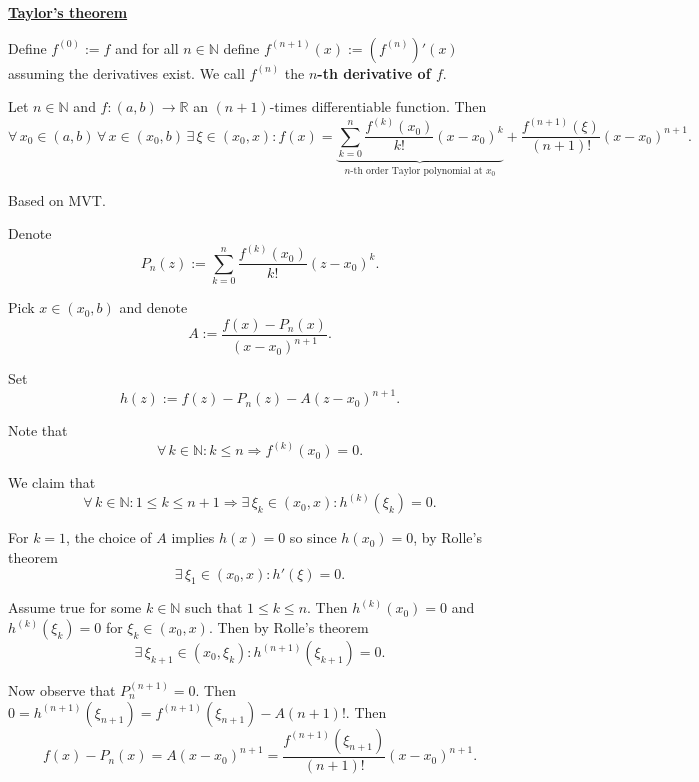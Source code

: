 \documentclass{notes}
\begin{document}
{\boldmath \bfseries \underline{Taylor's theorem}}

\begin{defn}
  Define $f^{(0)} := f$ and for all $n \in \mathbb N$ define $f^{(n + 1)}(x) := \left ( f^{(n)} \right )'(x)$ assuming the derivatives exist.
  We call $f^{(n)}$ the {\boldmath \bfseries $n$-th derivative of $f$}.
\end{defn}

\begin{thm}
  Let $n \in \mathbb N$ and $f \colon (a, b) \to \mathbb R$ an $(n + 1)$-times differentiable function.
  Then 
  \[
    \forall \, x_0 \in (a, b) \, \forall \, x \in (x_0, b) \, \exists \, \xi \in (x_0, x): f(x) = \underbrace{\sum_{k = 0}^n \frac{f^{(k)}(x_0)}{k!} (x - x_0)^k}_{\text{$n$-th order Taylor polynomial at $x_0$}} {} + \frac{f^{(n + 1)}(\xi)}{(n + 1)!} (x - x_0)^{n + 1}.
  \]
\end{thm}

\begin{prf}
  Based on MVT.
  
  Denote
  \[
    P_n(z) := \sum_{k = 0}^n \frac{f^{(k)}(x_0)}{k!} (z - x_0)^k.
  \]
  

  Pick $x \in (x_0, b)$ and denote 
  \[
    A := \frac{f(x) - P_n(x)}{(x - x_0)^{n + 1}}.
  \]
  
  Set 
  \[
    h(z) := f(z) - P_n(z) - A(z - x_0)^{n + 1}.
  \]
  
  Note that 
  \[
    \forall \, k \in \mathbb N: k \leq n \Rightarrow f^{(k)}(x_0) = 0.
  \]
  
  We claim that 
  \[
    \forall \, k \in \mathbb N: 1 \leq k \leq n + 1 \Rightarrow \exists \, \xi_k \in (x_0, x): h^{(k)}(\xi_k) = 0.
  \]
  
  For $k = 1$, the choice of $A$ implies $h(x) = 0$ so since $h(x_0) = 0$, by Rolle's theorem
  \[
    \exists \, \xi_1 \in (x_0, x): h'(\xi) = 0.
  \]
  
  Assume true for some $k \in \mathbb N$ such that $1 \leq k \leq n$.
  Then $h^{(k)}(x_0) = 0$ and $h^{(k)}(\xi_k) = 0$ for $\xi_k \in (x_0, x)$.
  Then by Rolle's theorem 
  \[
    \exists \, \xi_{k + 1} \in (x_0, \xi_k): h^{(n + 1)}(\xi_{k + 1}) = 0.
  \]
  
  Now observe that $P_n^{(n + 1)} = 0$.
  Then $0 = h^{(n + 1)}(\xi_{n + 1}) = f^{(n + 1)}(\xi_{n + 1}) - A (n + 1)!$.
  Then 
  \[
    f(x) - P_n(x) = A(x - x_0)^{n + 1} = \frac{f^{(n + 1)}(\xi_{n + 1})}{(n + 1)!} (x - x_0)^{n + 1}.
  \]
\end{prf}
\end{document}
